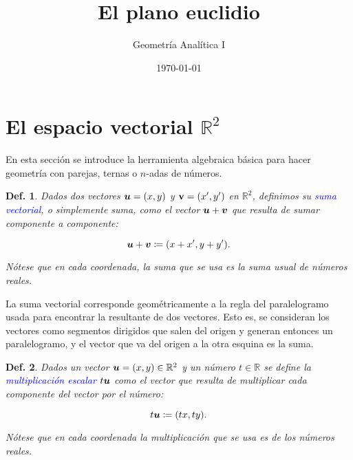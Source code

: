 \documentclass{article}
\title{\Huge{El plano euclidio}}
\author{Geometría Analítica I}
\date{\today}
\theoremstyle{definicion}
\newtheorem{definicion}{Def.}
\theoremstyle{definition}             %
\theoremstyle{definition}             %
\theoremstyle{definition}
\theoremstyle{definition}
\theoremstyle{observacion}
\theoremstyle{definition}
\theoremstyle{plain}
\theoremstyle{definition}
\theoremstyle{afirmacion}
\theoremstyle{notation}
\theoremstyle{definition}
\begin{document}
    \maketitle

    \section{El espacio vectorial \(\mathbb{R}^{2}\)}

    En esta sección se introduce la herramienta algebraica básica para hacer geometría con parejas, ternas o \(n\)-adas de números.

    \begin{definicion}
        Dados dos vectores \(\vb*{u} = (x, y)\) y \(\vb{v} = (x^{\prime}, y^{\prime})\) en \(\mathbb{R}^{2}\), definimos su \textcolor{blue}{suma vectorial}, o simplemente suma, como el vector \(\vb*{u} + \vb*{v}\) que resulta de sumar componente a componente:

        \begin{equation*}
            \vb*{u} + \vb*{v} \coloneq (x + x^{\prime}, y + y^{\prime}).
        \end{equation*}

        Nótese que en cada coordenada, la suma que se usa es la suma usual de números reales.
    \end{definicion}

    La suma vectorial corresponde geométricamente a la regla del paralelogramo usada para encontrar la resultante de dos vectores. Esto es, se consideran los vectores como segmentos dirigidos que salen del origen y generan entonces un paralelogramo, y el vector que va del origen a la otra esquina es la suma.
    

    \begin{definicion}
        Dados un vector \(\vb*{u} = (x, y) \in \mathbb{R}^{2}\) y un número \(t \in \mathbb{R}\) se define la \textcolor{blue}{multiplicación escalar} \(t \vb*{u}\) como el vector que resulta de multiplicar cada componente del vector por el número:

        \begin{equation*}
            t \vb*{u} \coloneq (t x, t y).
        \end{equation*}

        Nótese que en cada coordenada la multiplicación que se usa es de los números reales.
    \end{definicion}
\end{document}

